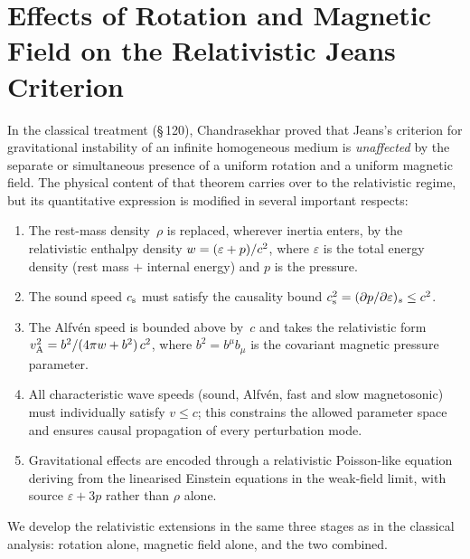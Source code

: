 
\section{Effects of Rotation and Magnetic Field on the Relativistic Jeans Criterion}
\label{sec:rel-120}

In the classical treatment (\S\,120), Chandrasekhar proved that
Jeans's criterion for gravitational instability of an infinite
homogeneous medium is \emph{unaffected} by the separate or simultaneous
presence of a uniform rotation and a uniform magnetic field.  The
physical content of that theorem carries over to the relativistic
regime, but its quantitative expression is modified in several important
respects:
\begin{enumerate}
\item[(i)] The rest-mass density~$\rho$ is replaced, wherever inertia
  enters, by the relativistic enthalpy density
  $w = (\varepsilon + p)/c^{2}$, where $\varepsilon$ is the
  total energy density (rest mass $+$ internal energy) and $p$ is the
  pressure.
\item[(ii)] The sound speed $c_{\mathrm{s}}$ must satisfy the causality bound
  $c_{\mathrm{s}}^{2} = (\partial p/\partial\varepsilon)_{s} \le c^{2}$.
\item[(iii)] The Alfv\'en speed is bounded above by~$c$ and takes the
  relativistic form
  $v_{\mathrm{A}}^{2} = b^{2}/(4\pi w + b^{2})\,c^{2}$, where
  $b^{2} = b^{\mu}b_{\mu}$ is the covariant magnetic pressure
  parameter.
\item[(iv)] All characteristic wave speeds (sound, Alfv\'en, fast and
  slow magnetosonic) must individually satisfy $v \le c$; this
  constrains the allowed parameter space and ensures causal propagation
  of every perturbation mode.
\item[(v)] Gravitational effects are encoded through a relativistic
  Poisson-like equation deriving from the linearised Einstein equations
  in the weak-field limit, with source $\varepsilon + 3p$ rather than
  $\rho$ alone.
\end{enumerate}

\noindent
We develop the relativistic extensions in the same three stages as in
the classical analysis: rotation alone, magnetic field alone, and the
two combined.

